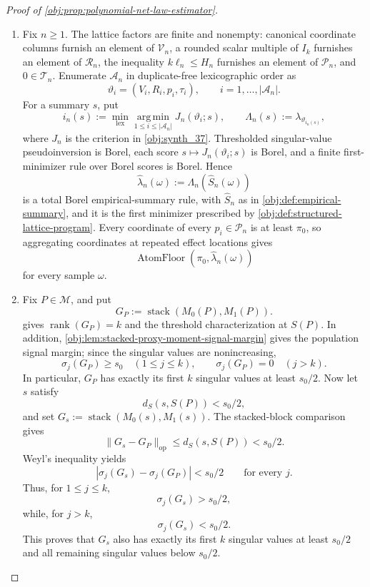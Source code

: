 \documentclass[11pt]{article}
\begin{document}
\begin{proof}[Proof of \cref{obj:prop:polynomial-net-law-estimator}]
\begin{enumerate}
\item Fix \(n\ge1\).  The lattice factors are finite and nonempty: canonical coordinate columns furnish an element of \(\mathcal V_n\), a rounded scalar multiple of \(I_k\) furnishes an element of \(\mathcal R_n\), the inequality \(k\ell_n\le H_n\) furnishes an element of \(\mathcal P_n\), and \(0\in\mathcal T_n\).  Enumerate \(\mathcal A_n\) in duplicate-free lexicographic order as
\[
\vartheta_i=(V_i,R_i,p_i,\tau_i),
\qquad i=1,\ldots,|\mathcal A_n|.
\]
For a summary \(s\), put
\[
i_n(s):=
\min_{\mathrm{lex}}\operatorname*{arg\,min}_{1\le i\le|\mathcal A_n|}
J_n(\vartheta_i;s),
\qquad
\Lambda_n(s):=\lambda_{\vartheta_{i_n(s)}} ,
\]
where \(J_n\) is the criterion in \cref{obj:synth_37}.  Thresholded singular-value pseudoinversion is Borel, each score \(s\mapsto J_n(\vartheta_i;s)\) is Borel, and a finite first-minimizer rule over Borel scores is Borel.  Hence
\[
\widehat\lambda_n(\omega):=\Lambda_n(\widehat S_n(\omega))
\]
is a total Borel empirical-summary rule, with \(\widehat S_n\) as in \cref{obj:def:empirical-summary}, and it is the first minimizer prescribed by \cref{obj:def:structured-lattice-program}.  Every coordinate of every \(p_i\in\mathcal P_n\) is at least \(\pi_0\), so aggregating coordinates at repeated effect locations gives
\[
\operatorname{AtomFloor}(\pi_0,\widehat\lambda_n(\omega))
\]
for every sample \(\omega\). %

\item Fix \(P\in\mathcal M\), and put
\[
G_P:=\operatorname{stack}(M_0(P),M_1(P)).
\]
 gives \(\operatorname{rank}(G_P)=k\) and the threshold characterization at \(S(P)\).  In addition, \cref{obj:lem:stacked-proxy-moment-signal-margin} gives the population signal margin; since the singular values are nonincreasing,
\[
\sigma_j(G_P)\ge s_0\quad (1\le j\le k),
\qquad
\sigma_j(G_P)=0\quad (j>k).
\]
In particular, \(G_P\) has exactly its first \(k\) singular values at least \(s_0/2\).  Now let \(s\) satisfy
\[
d_S(s,S(P))<s_0/2,
\]
and set \(G_s:=\operatorname{stack}(M_0(s),M_1(s))\).  The stacked-block comparison gives
\[
\|G_s-G_P\|_{\mathrm{op}}\le d_S(s,S(P))<s_0/2.
\]
Weyl's inequality yields
\[
|\sigma_j(G_s)-\sigma_j(G_P)|<s_0/2
\qquad\text{for every }j.
\]
Thus, for \(1\le j\le k\),
\[
\sigma_j(G_s)>s_0/2,
\]
while, for \(j>k\),
\[
\sigma_j(G_s)<s_0/2.
\]
This proves that \(G_s\) also has exactly its first \(k\) singular values at least \(s_0/2\) and all remaining singular values below \(s_0/2\). %


\end{enumerate}
\end{proof}
\end{document}

